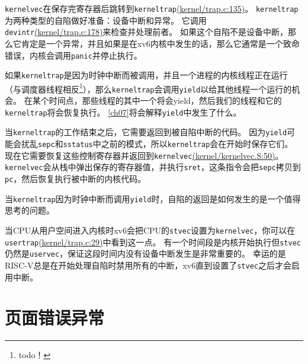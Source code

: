 \texttt{kernelvec}在保存完寄存器后跳转到\texttt{kerneltrap}\href{https://github.com/mit-pdos/xv6-riscv/blob/riscv//kernel/trap.c#L135}{(kernel/trap.c:135)}。
\texttt{kerneltrap}为两种类型的自陷做好准备：设备中断和异常。
它调用\texttt{devintr}\href{https://github.com/mit-pdos/xv6-riscv/blob/riscv//kernel/trap.c#L178}{(kernel/trap.c:178)}来检查并处理前者。
如果这个自陷不是设备中断，那么它肯定是一个异常，并且如果是在xv6内核中发生的话，那么它通常是一个致命错误，内核会调用\texttt{panic}并停止执行。

如果\texttt{kerneltrap}是因为时钟中断而被调用，并且一个进程的内核线程正在运行（与调度器线程相反\footnote{todo！}），那么\texttt{kerneltrap}会调用\texttt{yield}以给其他线程一个运行的机会。
在某个时间点，那些线程的其中一个将会yield，然后我们的线程和它的\texttt{kerneltrap}将会恢复执行。
\autoref{ch07}将会解释\texttt{yield}中发生了什么。

当\texttt{kerneltrap}的工作结束之后，它需要返回到被自陷中断的代码。
因为\texttt{yield}可能会扰乱\texttt{sepc}和\texttt{sstatus}中之前的模式，所以\texttt{kerneltrap}会在开始时保存它们。
现在它需要恢复这些控制寄存器并返回到\texttt{kernelvec}\href{URL}{(kernel/kernelvec.S:50)}。
\texttt{kernelvec}会从栈中弹出保存的寄存器值，并执行\texttt{sret}，这条指令会把\texttt{sepc}拷贝到\texttt{pc}，然后恢复执行被中断的内核代码。

当\texttt{kerneltrap}因为时钟中断而调用\texttt{yield}时，自陷的返回是如何发生的是一个值得思考的问题。

当CPU从用户空间进入内核时xv6会把CPU的\texttt{stvec}设置为\texttt{kernelvec}，你可以在\texttt{usertrap}\href{https://github.com/mit-pdos/xv6-riscv/blob/riscv//kernel/trap.c#L29}{(kernel/trap.c:29)}中看到这一点。
有一个时间段是内核开始执行但\texttt{stvec}仍然是\texttt{uservec}，保证这段时间内没有设备中断发生是非常重要的。
幸运的是RISC-V总是在开始处理自陷时禁用所有的中断，xv6直到设置了\texttt{stvec}之后才会启用中断。

\section{页面错误异常}\label{s4-6}
